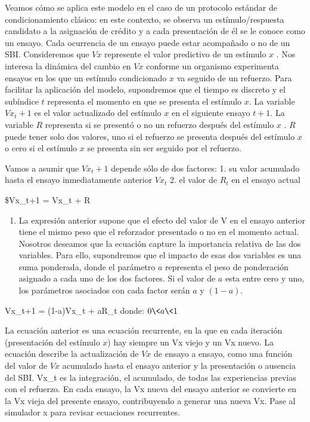 \documentclass[
  a4paper,
  DIV=11,
  numbers=noendperiod]{scrreprt}
\providecommand{\tightlist}{%
  \setlength{\itemsep}{0pt}\setlength{\parskip}{0pt}}\usepackage{longtable,booktabs,array}
\begin{document}
Veamos cómo se aplica este modelo en el caso de un protocolo estándar de
condicionamiento clásico: en este contexto, se observa un
estímulo/respuesta candidato a la asignación de crédito y a cada
presentación de él se le conoce como un ensayo. Cada ocurrencia de un
ensayo puede estar acompañado o no de un SBI. Consideremos que \(Vx\)
represente el valor predictivo de un estímulo \(x\) . Nos interesa la
dinámica del cambio en \(Vx\) conforme un organismo experimenta ensayos
en los que un estímulo condicionado \(x\) va seguido de un refuerzo.
Para facilitar la aplicación del modelo, supondremos que el tiempo es
discreto y el subíndice \(t\) representa el momento en que se presenta
el estímulo \(x\). La variable \(Vx_t+1\) es el valor actualizado del
estímulo \(x\) en el siguiente ensayo \(t+1\). La variable \(R\)
representa si se presentó o no un refuerzo después del estímulo \(x\) .
\(R\) puede tener solo dos valores, uno si el refuerzo se presenta
después del estímulo \(x\) o cero si el estímulo \(x\) se presenta sin
ser seguido por el refuerzo.

Vamos a asumir que \(Vx_t+1\) depende sólo de dos factores: 1. su valor
acumulado hasta el ensayo inmediatamente anterior \(Vx_t\) 2. el valor
de \(R_t\) en el ensayo actual

\$Vx\_t+1 = Vx\_t + R

\begin{enumerate}
\def\labelenumi{\arabic{enumi}.}
\setcounter{enumi}{2}
\tightlist
\item
  La expresión anterior supone que el efecto del valor de V en el ensayo
  anterior tiene el mismo peso que el reforzador presentado o no en el
  momento actual. Nosotros deseamos que la ecuación capture la
  importancia relativa de las dos variables. Para ello, supondremos que
  el impacto de esas dos variables es una suma ponderada, donde el
  parámetro \(a\) representa el peso de ponderación asignado a cada uno
  de los dos factores. Si el valor de \(a\) esta entre cero y uno, los
  parámetros asociados con cada factor serán \(a\) y \((1-a)\).
\end{enumerate}

\(%
\)Vx\_t+1 = (1-a)Vx\_t + aR\_t\(%
\) donde: \(0\<a\<1\)

La ecuación anterior es una ecuación recurrente, en la que en cada
iteración (presentación del estímulo \(x\)) hay siempre un Vx viejo y un
Vx nuevo. La ecuación describe la actualización de \(Vx\) de ensayo a
ensayo, como una función del valor de \(Vx\) acumulado hasta el ensayo
anterior y la presentación o ausencia del SBI. Vx\_t es la integración,
el acumulado, de todas las experiencias previas con el refuerzo. En cada
ensayo, la Vx nueva del ensayo anterior se convierte en la Vx vieja del
presente ensayo, contribuyendo a generar una nueva Vx. Pase al simulador
x para revisar ecuaciones recurrentes.
\end{document}
